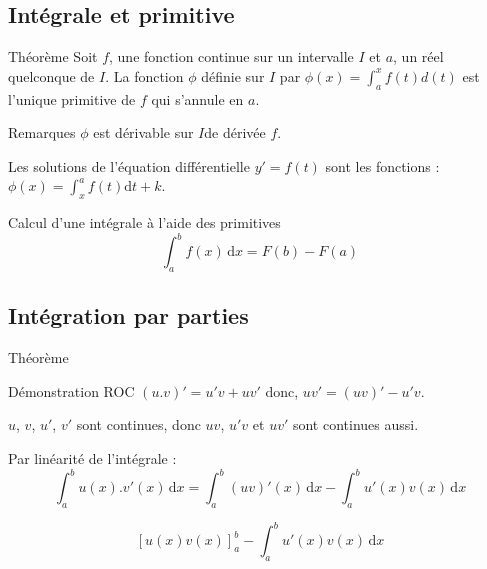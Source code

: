 \subsection{Intégrale et primitive}

\begin{bclogo}{Théorème}
Soit $f$, une fonction continue sur un intervalle $I$ et $a$, un réel quelconque de $I$. La fonction $\phi$ définie sur $I$ par $\phi (x)=\int_{a}^{x} f(t)d(t)$ est l'unique primitive de $f$ qui s'annule en $a$.
\end{bclogo}

\medskip

\begin{bclogo}{Remarques}
$\phi$ est dérivable sur $I$de dérivée $f$.

Les solutions de l'équation différentielle $y'=f(t)$ sont les fonctions : $\phi (x)=\int_{x}^{a} f(t)\mathrm{d}t+k$.
\end{bclogo}

\medskip

\begin{bclogo}{Calcul d'une intégrale à l'aide des primitives}
\[\int_{a}^{b} f(x)\,\mathrm{d}x=F(b)-F(a)\]
\end{bclogo}

\medskip

\subsection{Intégration par parties}
\begin{bclogo}{Théorème}
\end{bclogo}

\medskip

\begin{bclogo}{Démonstration ROC}
$(u.v)'=u'v+uv'$ donc, $uv'=(uv)'-u'v$. 

$u$, $v$, $u'$, $v'$ sont continues, donc $uv$, $u'v$ et $uv'$ sont continues aussi.

Par linéarité de l'intégrale :
\[\int_{a}^{b} u(x).v'(x)\,\mathrm{d}x= \int_{a}^{b}(uv)'(x)\,\mathrm{d}x-\int_{a}^{b}u'(x)v(x)\,\mathrm{d}x\]

\[\left[ u(x) v(x)\right]_{a}^{b}-\int_{a}^{b} u'(x)v(x)\,\mathrm{d}x\]
\end{bclogo} 